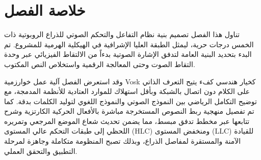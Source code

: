 \section{خلاصة الفصل}
تناول هذا الفصل تصميم بنية نظام التفاعل والتحكم الصوتي للذراع الروبوتية ذات الخمس درجات حرية، ليمثل الطبقة العليا الإشرافية في الهيكلية الهرمية للمشروع. تم البدء بتحديد البنية العامة لتدفق الإشارة الصوتية بدءاً من الالتقاط الفيزيائي عبر وحدة التقاط الصوت وحتى المعالجة الرقمية واستخلاص النص المكتوب.

وقد استعرض الفصل آلية عمل خوارزمية \textenglish{Vosk} كخيار هندسي كفء يتيح التعرف الذاتي على الكلام دون اتصال بالشبكة وبأقل استهلاك للموارد العتادية للأنظمة المدمجة، مع توضيح التكامل الرياضي بين النموذج الصوتي والنموذج اللغوي لتوليد الكلمات بدقة. كما تم تفصيل منهجية ربط النصوص المستخرجة مباشرة بالأفعال الحركية الكارتزية وشرح تتابعها عبر مخطط تدفق مبسط، مما يضمن تحديث شعاع الموضع المرجعي وتمريره اللحظي إلى طبقات التحكم عالي المستوى (\textenglish{HLC}) ومنخفض المستوى (\textenglish{LLC}) للقيادة الآمنة والمستقرة لمفاصل الذراع، وبذلك تصبح المنظومة متكاملة وجاهزة لمرحلة التطبيق والتحقق العملي.